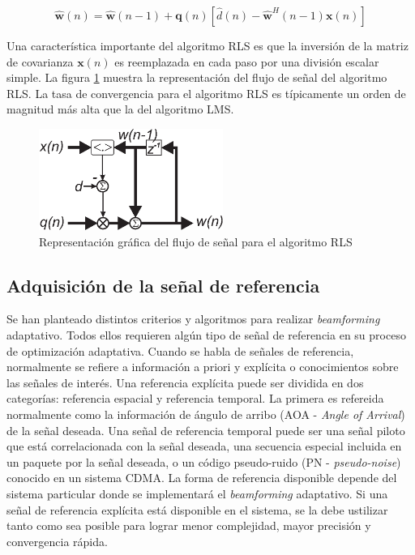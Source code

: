 \begin{equation}
\mathbf{\hat{w}}(n) = \mathbf{\hat{w}}(n-1) + \mathbf{q}(n) [ \hat{d}(n) - \mathbf{\hat{w}}^H (n-1) \mathbf{x}(n) ]
\end{equation}

Una característica importante del algoritmo RLS es que la inversión de la matriz de covarianza $\mathbf{x}(n)$ es reemplazada en cada paso por una división escalar simple. La figura \ref{fig:rls_algorithm} muestra la representación del flujo de señal del algoritmo RLS. La tasa de convergencia para el algoritmo RLS es típicamente un orden de magnitud más alta que la del algoritmo LMS.

\begin{figure}[htb!]
        \centering
        \includegraphics[width=6cm]{./figures/C02-rls_signal_flow}
        \caption{Representación gráfica del flujo de señal para el algoritmo RLS}
        \label{fig:rls_algorithm}
\end{figure}

\subsection{Adquisición de la señal de referencia}

Se han planteado distintos criterios y algoritmos para realizar \textit{beamforming} adaptativo. Todos ellos requieren algún tipo de señal de referencia en su proceso de optimización adaptativa. Cuando se habla de señales de referencia, normalmente se refiere a información a priori y explícita o conocimientos sobre las señales de interés. Una referencia explícita puede ser dividida en dos categorías: referencia espacial y referencia temporal. La primera es refereida normalmente como la información de ángulo de arribo (AOA - \textit{Angle of Arrival}) de la señal deseada. Una señal de referencia temporal puede ser una señal piloto que está correlacionada con la señal deseada, una secuencia especial incluida en un paquete por la señal deseada, o un código pseudo-ruido (PN - \textit{pseudo-noise}) conocido en un sistema CDMA. La forma de referencia disponible depende del sistema particular donde se implementará el \textit{beamforming} adaptativo. Si una señal de referencia explícita está disponible en el sistema, se la debe ustilizar tanto como sea posible para lograr menor complejidad, mayor precisión y convergencia rápida.

